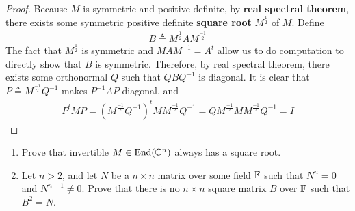 \documentclass{report}
\begin{document}
\begin{proof}
  Because $M$ is symmetric and positive definite, by \textbf{real spectral theorem}, there exists some symmetric positive definite \textbf{square root} $M^{\frac{1}{2}}$ of $M$.  Define 
\begin{align*}
B \triangleq M^{\frac{1}{2}}AM^{\frac{-1}{2}}
\end{align*}
The fact that $M^{\frac{1}{2}}$ is symmetric and $MAM^{-1}=A^t$ allow us to do computation to directly show that  $B$ is symmetric. Therefore, by real spectral theorem, there exists some orthonormal $Q$ such that  $QBQ^{-1}$ is diagonal. It is clear that $P\triangleq M^{\frac{-1}{2}}Q^{-1}$ makes $P^{-1}AP$ diagonal, and 
\begin{align*}
P^tMP= (M^{\frac{-1}{2}}Q^{-1})^t M M^{\frac{-1}{2}}Q^{-1}= Q M^{\frac{-1}{2}}MM^{\frac{-1}{2}}Q^{-1}=I
\end{align*}
\end{proof}
\begin{question}{}{}
\begin{enumerate}[label=(\alph*)]
  \item Prove that invertible $M \in \operatorname{End}(\mathbb{C}^n)$ always has a square root. 
  \item  Let $n>2$, and let $N$ be a  $n\times n$ matrix over some field $\mathbb{F}$ such that $N^n=0$ and $N^{n-1}\neq 0$. Prove that there is no $n\times n$ square matrix $B$ over $\mathbb{F}$  such that $B^2=N$. 
\end{enumerate}
\end{question}
\end{document}
